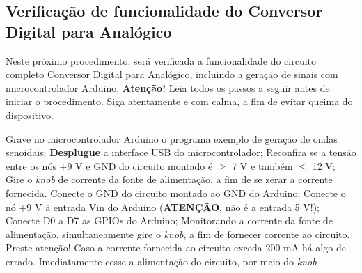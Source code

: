 \documentclass[addpoints]{exam}
\begin{document}
\begin{questions}

\section*{Verificação de funcionalidade do Conversor Digital para Analógico}

Neste próximo procedimento, será verificada a funcionalidade do circuito completo Conversor Digital para Analógico, incluindo a geração de sinais com microcontrolador Arduino. \textbf{Atenção!} Leia todos os passos a seguir antes de iniciar o procedimento. Siga atentamente e com calma, a fim de evitar queima do dispositivo.

\begin{subparts}
\subpart Grave no microcontrolador Arduino o programa exemplo de geração de ondas senoidais;
\subpart \textbf{Desplugue} a interface USB do microcontrolador;
\subpart Reconfira se a tensão entre os nós +9 V e GND do circuito montado é $\geq$ 7 V e também $\leq$ 12 V;
\subpart Gire o \textit{knob} de corrente da fonte de alimentação, a fim de se zerar a corrente fornecida. 
\subpart Conecte o GND do circuito montado ao GND do Arduino;
\subpart Conecte o nó +9 V à entrada Vin do Arduino (\textbf{ATENÇÃO}, não é a entrada 5 V!);
\subpart Conecte D0 a D7 as GPIOs do Arduino;
\subpart Monitorando a corrente da fonte de alimentação, simultaneamente gire o \textit{knob}, a fim de fornecer corrente ao circuito. Preste atenção! Caso a corrente fornecida ao circuito exceda 200 mA há algo de errado. Imediatamente cesse a alimentação do circuito, por meio do \textit{knob} 
\end{subparts}

\pagebreak




\end{questions}


\end{document}

